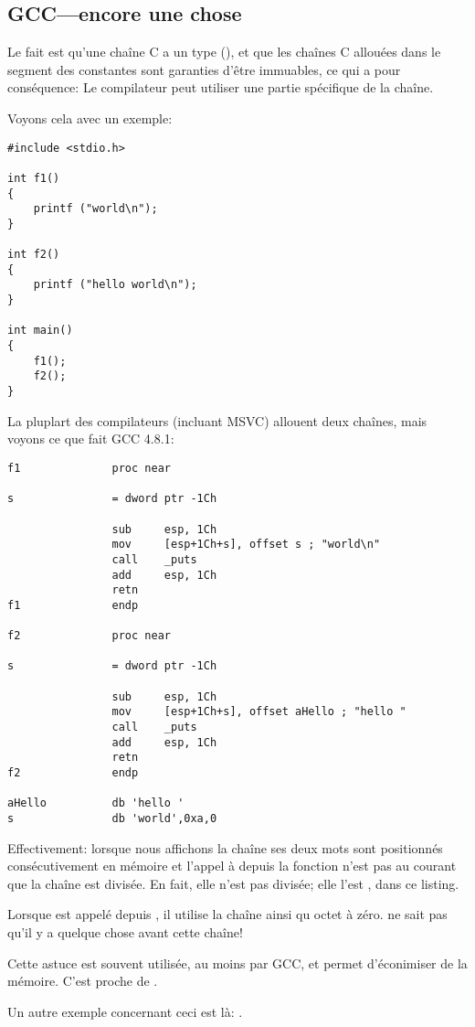 \subsection{GCC---encore une chose}
\label{use_parts_of_C_strings}

Le fait est qu'une chaîne C  a un type  (),
et que les chaînes C allouées dans le segment des constantes sont garanties d'être immuables, ce qui a pour
conséquence:
Le compilateur peut utiliser une partie spécifique de la chaîne.

Voyons cela avec un exemple:

\begin{lstlisting}[style=customc]
#include <stdio.h>

int f1()
{
	printf ("world\n");
}

int f2()
{
	printf ("hello world\n");
}

int main()
{
	f1();
	f2();
}
\end{lstlisting}

La pluplart des compilateurs \CCpp{} (incluant MSVC) allouent deux chaînes, mais voyons ce que fait GCC 4.8.1:

\begin{lstlisting}[caption=GCC 4.8.1 + IDA listing,style=customasmx86]
f1              proc near

s               = dword ptr -1Ch

                sub     esp, 1Ch
                mov     [esp+1Ch+s], offset s ; "world\n"
                call    _puts
                add     esp, 1Ch
                retn
f1              endp

f2              proc near

s               = dword ptr -1Ch

                sub     esp, 1Ch
                mov     [esp+1Ch+s], offset aHello ; "hello "
                call    _puts
                add     esp, 1Ch
                retn
f2              endp

aHello          db 'hello '
s               db 'world',0xa,0
\end{lstlisting}

Effectivement: lorsque nous affichons la chaîne  ses deux mots sont positionnés
consécutivement en mémoire et l'appel à \puts depuis la fonction 
n'est pas au courant que la chaîne est divisée.
En fait, elle n'est pas divisée; elle l'est , dans ce listing.

Lorsque \puts est appelé depuis , il utilise la chaîne  ainsi qu octet à zéro. \puts ne sait pas
qu'il y a quelque chose avant cette chaîne!

Cette astuce est souvent utilisée, au moins par GCC, et permet d'éconimiser de la mémoire.
C'est proche de . %

Un autre exemple concernant ceci est là: .

